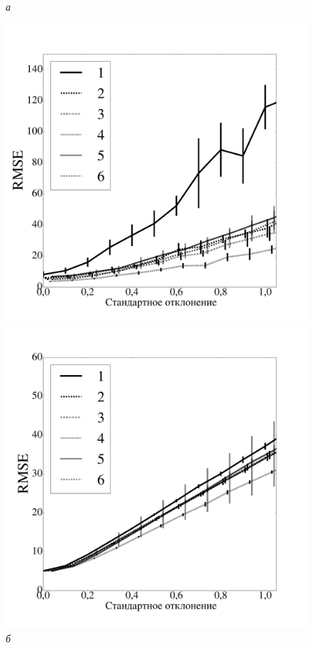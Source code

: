\begin{figure}[tbh!]


\caption*{\textit{а}}
\includegraphics[width=1.0\textwidth]{./plots/var/boston/rmse_data2.pdf}
\endminipage\hfill
{}
\caption*{\textit{б}}
\includegraphics[width=1.0\textwidth]{./plots/var/protein/rmse_data2.pdf}


\end{figure}
